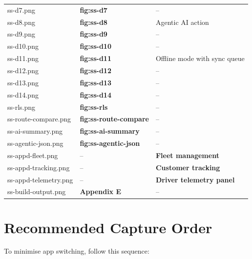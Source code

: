 \documentclass[11pt,a4paper]{article}
\newcommand{\filesave}[1]{{\ttfamily\small #1}}
\begin{document}
\begin{longtable}{@{}p{3.5cm} p{4.5cm} p{5.0cm}@{}}
  \filesave{ss-d7.png}             & \textbf{fig:ss-d7}          & -- \\
  \filesave{ss-d8.png}             & \textbf{fig:ss-d8}          & Agentic AI action \\
  \filesave{ss-d9.png}             & \textbf{fig:ss-d9}          & -- \\
  \filesave{ss-d10.png}            & \textbf{fig:ss-d10}         & -- \\
  \filesave{ss-d11.png}            & \textbf{fig:ss-d11}         & Offline mode with sync queue \\
  \filesave{ss-d12.png}            & \textbf{fig:ss-d12}         & -- \\
  \filesave{ss-d13.png}            & \textbf{fig:ss-d13}         & -- \\
  \filesave{ss-d14.png}            & \textbf{fig:ss-d14}         & -- \\
  \filesave{ss-rls.png}            & \textbf{fig:ss-rls}         & -- \\
  \filesave{ss-route-compare.png}  & \textbf{fig:ss-route-compare} & -- \\
  \filesave{ss-ai-summary.png}     & \textbf{fig:ss-ai-summary}  & -- \\
  \filesave{ss-agentic-json.png}   & \textbf{fig:ss-agentic-json} & -- \\
  \filesave{ss-appd-fleet.png}     & --                          & \textbf{Fleet management} \\
  \filesave{ss-appd-tracking.png}  & --                          & \textbf{Customer tracking} \\
  \filesave{ss-appd-telemetry.png} & --                          & \textbf{Driver telemetry panel} \\
  \filesave{ss-build-output.png}   & \textbf{Appendix E}         & -- \\
  \bottomrule
\end{longtable}

\section{Recommended Capture Order}

To minimise app switching, follow this sequence:
\end{document}
